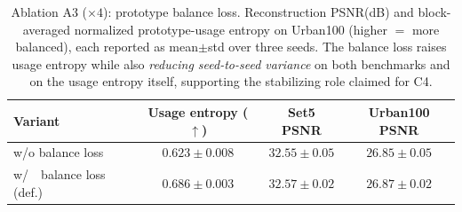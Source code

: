 \begin{table}[H]
\centering
\caption{Ablation A3 ($\times 4$): prototype balance loss. Reconstruction PSNR(dB) and
block-averaged normalized prototype-usage entropy on Urban100 (higher $=$ more balanced),
each reported as mean$\pm$std over three seeds. The balance loss raises usage
entropy while also \emph{reducing seed-to-seed variance} on both benchmarks and on the usage
entropy itself, supporting the stabilizing role claimed for C4.}
\label{tab:abl_a3}
\begingroup
\scriptsize
\setlength{\tabcolsep}{3pt}
\renewcommand{\arraystretch}{1.05}
\begin{tabular*}{\columnwidth}{@{\extracolsep{\fill}}lccc}
\toprule
Variant & Usage entropy ($\uparrow$) & Set5 PSNR & Urban100 PSNR \\
\midrule
w/o balance loss          & $0.623\pm0.008$ & $32.55\pm0.05$ & $26.85\pm0.05$ \\
w/\ \ balance loss (def.) & $\mathbf{0.686\pm0.003}$ & $\mathbf{32.57\pm0.02}$ & $\mathbf{26.87\pm0.02}$ \\
\bottomrule
\end{tabular*}
\endgroup
\end{table}

